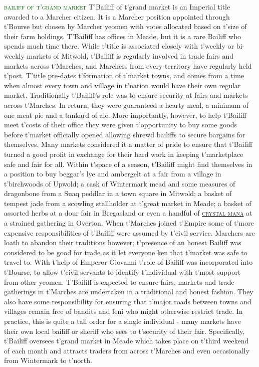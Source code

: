 \documentclass[twoside,11pt,b5paper,twocolumn]{scrbook}
\newcommand{\estcab}[1]{\textsc{\textcolor{marron}{#1}}}
\newcommand{\keyword}[1]{\textcolor{darkgreen}{#1}}
\renewcommand{\paragraph}[1]{\par\noindent\markboth{#1}{#1}\estcab{\keyword{#1}}\label{#1} }
\newcommand{\see}[1]{{\estcab{\hyperref[#1]{#1}}}}
\begin{document}
\paragraph{bailiff of t'grand market} T'Bailiff of t'grand market is an Imperial title awarded to a Marcher citizen. It is a Marcher position appointed through t'Bourse but chosen by Marcher yeomen with votes allocated based on t'size of their farm holdings. T'Bailiff has offices in Meade, but it is a rare Bailiff who spends much time there. While t'title is associated closely with t'weekly or bi-weekly markets of Mitwold, t'Bailiff is regularly involved in trade fairs and markets across t'Marches, and Marchers from every territory have regularly held t'post. T'title pre-dates t'formation of t'market towns, and comes from a time when almost every town and village in t'nation would have their own regular market. Traditionally t'Bailiff's role was to ensure security at fairs and markets across t'Marches. In return, they were guaranteed a hearty meal, a minimum of one meat pie and a tankard of ale. More importantly, however, to help t'Bailiff meet t'costs of their office they were given t'opportunity to buy some goods before t'market officially opened allowing shrewd bailiffs to secure bargains for themselves. Many markets considered it a matter of pride to ensure that t'Bailiff turned a good profit in exchange for their hard work in keeping t'marketplace safe and fair for all. Within t'space of a season, t'Bailiff might find themselves in a position to buy beggar's lye and ambergelt at a fair from a village in t'birchwoods of Upwold; a cask of Wintermark mead and some measures of dragonbone from a Suaq peddlar in a town square in Mitwold; a basket of tempest jade from a scowling stallholder at t'great market in Meade; a basket of assorted herbs at a dour fair in Bregasland or even a handful of \see{crystal mana} at a strained gathering in Overton. When t'Marches joined t'Empire some of t'more expensive responsibilities of t'Bailiff were assumed by t'civil service. Marchers are loath to abandon their traditions however; t'presence of an honest Bailiff was considered to be good for trade as it let everyone ken that t'market was safe to travel to. With t'help of Emperor Giovanni t'role of Bailiff was incorporated into t'Bourse, to allow t'civil servants to identify t'individual with t'most support from other yeomen. T'Bailiff is expected to ensure fairs, markets and trade gatherings in t'Marches are undertaken in a traditional and honest fashion. They also have some responsibility for ensuring that t'major roads between towns and villages remain free of bandits and feni who might otherwise restrict trade. In practice, this is quite a tall order for a single individual - many markets have their own local bailiff or sheriff who sees to t'security of their fair. Specifically, t'Bailiff oversees t'grand market in Meade which takes place on t'third weekend of each month and attracts traders from across t'Marches and even occasionally from Wintermark to t'north. 
\end{document}
